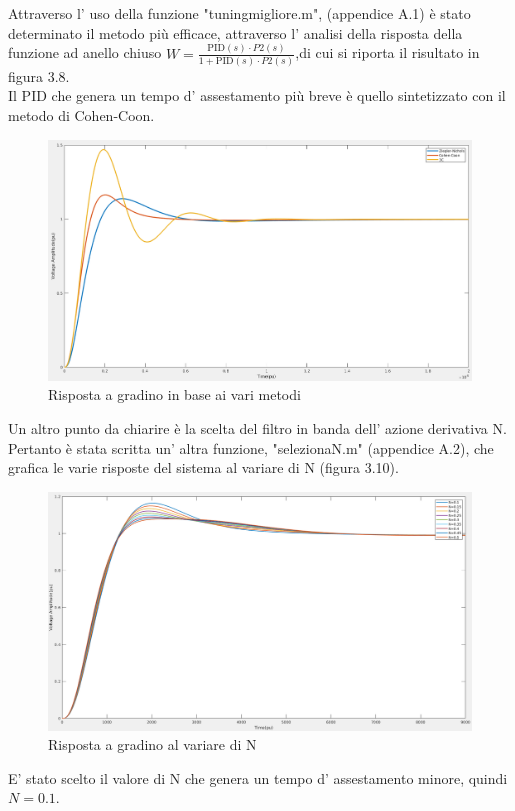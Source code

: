 \documentclass[Lau,noexaminfo]{sapthesis}
\begin{document}
	Attraverso l' uso della funzione "tuning\textunderscore migliore.m", (appendice A.1) è stato determinato il metodo più efficace, attraverso l' analisi della risposta della funzione ad anello chiuso $W=\frac{\text{PID}(s)\cdot P2(s)}{1+\text{PID}(s)\cdot P2(s)}$,di cui si riporta il risultato in figura 3.8.\\
	Il PID che genera un tempo d' assestamento più breve è
	quello sintetizzato con il metodo di Cohen-Coon.
	\begin{figure}
		\centering
		\includegraphics[scale=0.26]{step_response_metodi_P2}
			\caption{Risposta a gradino in base ai vari metodi}
	\end{figure}
	Un altro punto da chiarire è la scelta del filtro in banda dell' azione derivativa N. Pertanto è stata scritta un' altra funzione, "seleziona\textunderscore N.m" (appendice A.2), che grafica le varie risposte del sistema al variare di N (figura 3.10).
	\begin{figure}[h]
		\centering
		\includegraphics[height=0.33\textheight]{vari_N}
		\caption{Risposta a gradino al variare di N}
	\end{figure}E' stato scelto il valore di N che genera un tempo d' assestamento minore, quindi $N=0.1$.
\end{document}
